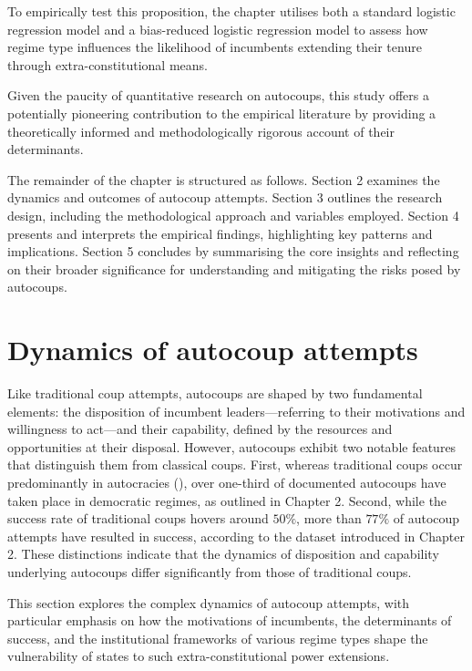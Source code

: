 \documentclass[
  12pt,
]{report}
\begin{document}
To empirically test this proposition, the chapter utilises both a
standard logistic regression model and a bias-reduced logistic
regression model to assess how regime type influences the likelihood of
incumbents extending their tenure through extra-constitutional means.

Given the paucity of quantitative research on autocoups, this study
offers a potentially pioneering contribution to the empirical literature
by providing a theoretically informed and methodologically rigorous
account of their determinants.

The remainder of the chapter is structured as follows. Section 2
examines the dynamics and outcomes of autocoup attempts. Section 3
outlines the research design, including the methodological approach and
variables employed. Section 4 presents and interprets the empirical
findings, highlighting key patterns and implications. Section 5
concludes by summarising the core insights and reflecting on their
broader significance for understanding and mitigating the risks posed by
autocoups.

\section{Dynamics of autocoup
attempts}\label{dynamics-of-autocoup-attempts}

Like traditional coup attempts, autocoups are shaped by two fundamental
elements: the disposition of incumbent leaders---referring to their
motivations and willingness to act---and their capability, defined by
the resources and opportunities at their disposal. However, autocoups
exhibit two notable features that distinguish them from classical coups.
First, whereas traditional coups occur predominantly in autocracies
(), over one-third
of documented autocoups have taken place in democratic regimes, as
outlined in Chapter 2. Second, while the success rate of traditional
coups hovers around \(50\%\), more than \(77\%\) of autocoup attempts
have resulted in success, according to the dataset introduced in Chapter
2. These distinctions indicate that the dynamics of disposition and
capability underlying autocoups differ significantly from those of
traditional coups.

This section explores the complex dynamics of autocoup attempts, with
particular emphasis on how the motivations of incumbents, the
determinants of success, and the institutional frameworks of various
regime types shape the vulnerability of states to such
extra-constitutional power extensions.
\end{document}
